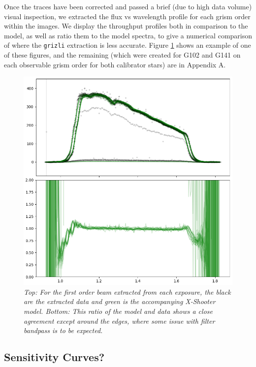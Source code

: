 \documentclass[12pt]{article}
\begin{document}
Once the traces have been corrected and passed a brief (due to high data volume) visual inspection, we extracted 
the flux vs wavelength profile for each grism order within the images. We display the throughput profiles both in comparison
to the model, as well as ratio them to the model spectra, to give a numerical comparison of where the \texttt{grizli} extraction
is less accurate. Figure \ref{fig:ex_pce} shows an example of one of these figures, and the remaining (which were created
for G102 and G141 on each observable grism order for both calibrator stars) are in Appendix A. 

\begin{figure}[h!]
   \includegraphics[width=.9\textwidth]{images/ex_pce_ratio.png}
    
\caption{\textit{Top: For the first order beam extracted from each exposure, the black are the extracted data
    and green is the accompanying X-Shooter model. Bottom: This ratio of the model and data shows a close agreement
    except around the edges, where some issue with filter bandpass is to be expected.}}
\label{fig:ex_pce}
\end{figure}
    
\subsection{Sensitivity Curves?} 
\end{document}
